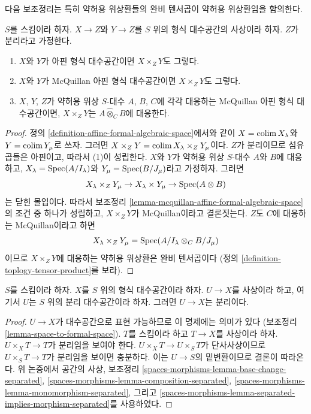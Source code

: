 \noindent
다음 보조정리는 특히 약허용 위상환들의 완비 텐서곱이
약허용 위상환임을 함의한다.

\begin{lemma}
\label{lemma-fibre-product-affines-over-separated}
$S$를 스킴이라 하자. $X \to Z$와 $Y \to Z$를
$S$ 위의 형식 대수공간의 사상이라 하자. $Z$가 분리라고 가정한다.
\begin{enumerate}
\item $X$와 $Y$가 아핀 형식 대수공간이면 $X \times_Z Y$도 그렇다.
\item $X$와 $Y$가 McQuillan 아핀 형식 대수공간이면
$X \times_Z Y$도 그렇다.
\item $X$, $Y$, $Z$가 약허용 위상 $S$-대수
$A$, $B$, $C$에 각각 대응하는 McQuillan 아핀 형식 대수공간이면,
$X \times_Z Y$는 $A \widehat{\otimes}_C B$에 대응한다.
\end{enumerate}
\end{lemma}

\begin{proof}
정의 \ref{definition-affine-formal-algebraic-space}에서와 같이
$X = \mathop{\mathrm{colim}}\nolimits X_\lambda$와 $Y = \mathop{\mathrm{colim}}\nolimits Y_\mu$로 쓰자.
그러면 $X \times_Z Y = \mathop{\mathrm{colim}}\nolimits X_\lambda \times_Z Y_\mu$이다.
$Z$가 분리이므로 섬유곱들은 아핀이고, 따라서 (1)이 성립한다.
$X$와 $Y$가 약허용 위상 $S$-대수 $A$와 $B$에 대응하고,
$X_\lambda = \mathop{\mathrm{Spec}}(A/I_\lambda)$와 $Y_\mu = \mathop{\mathrm{Spec}}(B/J_\mu)$라고
가정하자. 그러면
$$
X_\lambda \times_Z Y_\mu \to
X_\lambda \times Y_\mu \to \mathop{\mathrm{Spec}}(A \otimes B)
$$
는 닫힌 몰입이다. 따라서 보조정리
\ref{lemma-mcquillan-affine-formal-algebraic-space}의 조건 중 하나가
성립하고, $X \times_Z Y$가 McQuillan이라고 결론짓는다.
$Z$도 $C$에 대응하는 McQuillan이라고 하면
$$
X_\lambda \times_Z Y_\mu = \mathop{\mathrm{Spec}}(A/I_\lambda \otimes_C B/J_\mu)
$$
이므로 $X \times_Z Y$에 대응하는 약허용 위상환은 완비 텐서곱이다
(정의 \ref{definition-toplogy-tensor-product}를 보라).
\end{proof}

\begin{lemma}
\label{lemma-separated-from-separated}
$S$를 스킴이라 하자. $X$를 $S$ 위의 형식 대수공간이라 하자.
$U \to X$를 사상이라 하고, 여기서 $U$는 $S$ 위의 분리
대수공간이라 하자. 그러면 $U \to X$는 분리이다.
\end{lemma}

\begin{proof}
$U \to X$가 대수공간으로 표현 가능하므로 이 명제에는 의미가 있다
(보조정리 \ref{lemma-space-to-formal-space}).
$T$를 스킴이라 하고 $T \to X$를 사상이라 하자.
$U \times_X T \to T$가 분리임을 보여야 한다.
$U \times_X T \to U \times_S T$가 단사사상이므로
$U \times_S T \to T$가 분리임을 보이면 충분하다.
이는 $U \to S$의 밑변환이므로 결론이 따라온다.
위 논증에서 공간의 사상, 보조정리
\ref{spaces-morphisms-lemma-base-change-separated},
\ref{spaces-morphisms-lemma-composition-separated},
\ref{spaces-morphisms-lemma-monomorphism-separated}, 그리고
\ref{spaces-morphisms-lemma-separated-implies-morphism-separated}를
사용하였다.
\end{proof}

